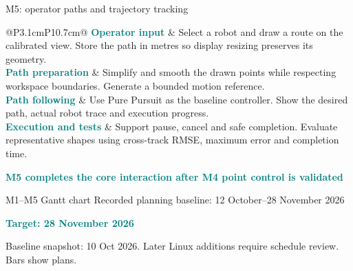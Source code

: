\documentclass[11pt,aspectratio=169]{beamer}
\newcommand{\planrow}[2]{\textcolor{Teal}{\textbf{#1}} & #2 \\\noalign{\vskip 12pt}}
\begin{document}
\begin{frame}{M5: operator paths and trajectory tracking}
\small
\begin{tabular}{@{}P{3.1cm}P{10.7cm}@{}}
\planrow{Operator input}{Select a robot and draw a route on the calibrated view. Store the path in metres so display resizing preserves its geometry.}
\planrow{Path preparation}{Simplify and smooth the drawn points while respecting workspace boundaries. Generate a bounded motion reference.}
\planrow{Path following}{Use Pure Pursuit as the baseline controller. Show the desired path, actual robot trace and execution progress.}
\planrow{Execution and tests}{Support pause, cancel and safe completion. Evaluate representative shapes using cross-track RMSE, maximum error and completion time.}
\end{tabular}

\textcolor{Teal}{\textbf{M5 completes the core interaction after M4 point control is validated}}
\end{frame}

\begin{frame}{M1--M5 Gantt chart}
{\small\textcolor{Muted}{Recorded planning baseline: 12 October--28 November 2026}}
\vspace{2mm}


\textcolor{Teal}{\textbf{Target: 28 November 2026}}

{\tiny\textcolor{Muted}{Baseline snapshot: 10 Oct 2026. Later Linux additions require schedule review. Bars show plans.}}
\end{frame}
\end{document}
